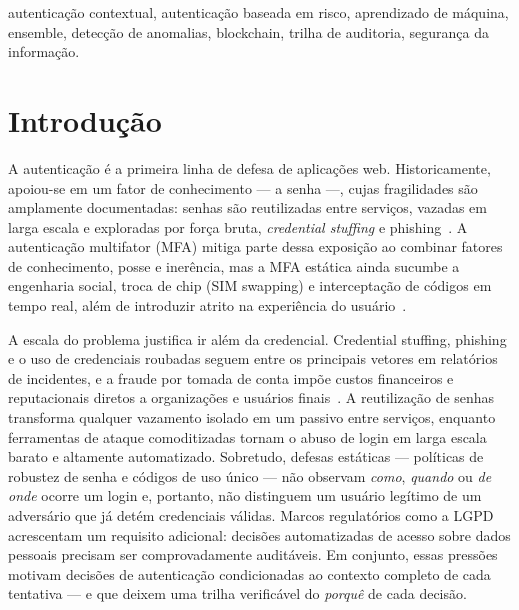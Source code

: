 \documentclass[conference]{IEEEtran}
\begin{document}
\begin{IEEEkeywords}
autenticação contextual, autenticação baseada em risco, aprendizado de
máquina, ensemble, detecção de anomalias, blockchain, trilha de
auditoria, segurança da informação.
\end{IEEEkeywords}

\section{Introdução}
A autenticação é a primeira linha de defesa de aplicações web.
Historicamente, apoiou-se em um fator de conhecimento --- a senha ---,
cujas fragilidades são amplamente documentadas: senhas são reutilizadas
entre serviços, vazadas em larga escala e exploradas por força bruta,
\emph{credential stuffing} e phishing~\cite{nist80063b,verizon2024}. A
autenticação multifator (MFA) mitiga parte dessa exposição ao combinar
fatores de conhecimento, posse e inerência, mas a MFA estática ainda
sucumbe a engenharia social, troca de chip (SIM swapping) e interceptação
de códigos em tempo real, além de introduzir atrito na experiência do
usuário~\cite{nist80063b}.

A escala do problema justifica ir além da credencial. Credential
stuffing, phishing e o uso de credenciais roubadas seguem entre os
principais vetores em relatórios de incidentes, e a fraude por tomada de
conta impõe custos financeiros e reputacionais diretos a organizações e
usuários finais~\cite{verizon2024}. A reutilização de senhas transforma
qualquer vazamento isolado em um passivo entre serviços, enquanto
ferramentas de ataque comoditizadas tornam o abuso de login em larga
escala barato e altamente automatizado. Sobretudo, defesas estáticas
--- políticas de robustez de senha e códigos de uso único --- não
observam \emph{como}, \emph{quando} ou \emph{de onde} ocorre um login e,
portanto, não distinguem um usuário legítimo de um adversário que já
detém credenciais válidas. Marcos regulatórios como a
LGPD~\cite{lgpd2018} acrescentam um requisito adicional: decisões
automatizadas de acesso sobre dados pessoais precisam ser comprovadamente
auditáveis. Em conjunto, essas pressões motivam decisões de autenticação
condicionadas ao contexto completo de cada tentativa --- e que deixem
uma trilha verificável do \emph{porquê} de cada decisão.
\end{document}
